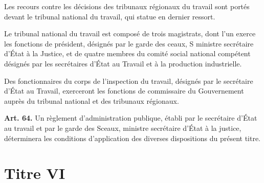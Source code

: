 \documentclass[french,twoside]{book} %
\newcommand{\labelchar}[1]{\textbf{\color{rubric} #1}}
\begin{document}
\noindent Les recours contre les décisions des tribunaux régionaux du travail sont portés devant le tribunal national du travail, qui statue en dernier ressort.\par
Le tribunal national du travail est composé de trois magistrats, dont l’un exerce les fonctions de président, désignés par le garde des ceaux, S ministre secrétaire d’État à la Justice, et de quatre membres du comité social national compétent désignés par les secrétaires d’État au Travail et à la production industrielle.\par
Des fonctionnaires du corps de l’inspection du travail, désignés par le secrétaire d’État au Travail, exerceront les fonctions de commissaire du Gouvernement auprès du tribunal national et des tribunaux régionaux.\par
\bigbreak
\noindent \labelchar{Art. 64.} Un règlement d’administration publique, établi par le secrétaire d’État au travail et par le garde des Sceaux, ministre secrétaire d’État à la justice, déterminera les conditions d’application des diverses dispositions du présent titre.
\section[{Titre VI}]{Titre VI}\renewcommand{\leftmark}{Titre VI}
\end{document}
